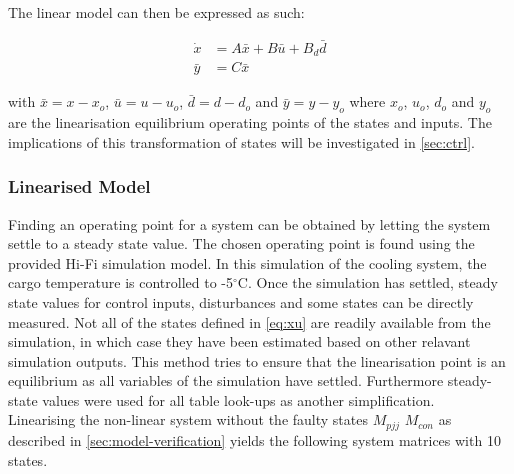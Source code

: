 The linear model can then be expressed as such:

\begin{equation} \label{eq:state_space_linear}
	\begin{split}
		\dot{x} & = A\bar{x} + B\bar{u} + B_d\bar{d} \\
		\bar{y} & = C\bar{x}
	\end{split}
\end{equation}

with $\bar{x} = x-x_o$, $\bar{u} = u-u_o$, $\bar{d} = d-d_o$ and $\bar{y} = y-y_o$ where $x_o$, $u_o$, $d_o$ and $y_o$ are the linearisation equilibrium operating points of the states and inputs. The implications of this transformation of states will be investigated in \cref{sec:ctrl}.

\subsubsection{Linearised Model}
Finding an operating point for a system can be obtained by letting the system settle to a steady state value. The chosen operating point is found using the provided Hi-Fi simulation model. In this simulation of the cooling system, the cargo temperature is controlled to -5$^{\circ}$C. Once the simulation has settled, steady state values for control inputs, disturbances and some states can be directly measured. Not all of the states defined in \cref{eq:xu} are readily available from the simulation, in which case they have been estimated based on other relavant simulation outputs. This method tries to ensure that the linearisation point is an equilibrium as all variables of the simulation have settled. Furthermore steady-state values were used for all table look-ups as another simplification.\\

Linearising the non-linear system without the faulty states $ M_{pjj} $ $ M_{con} $ as described in \cref{sec:model-verification} yields the following system matrices with 10 states.

